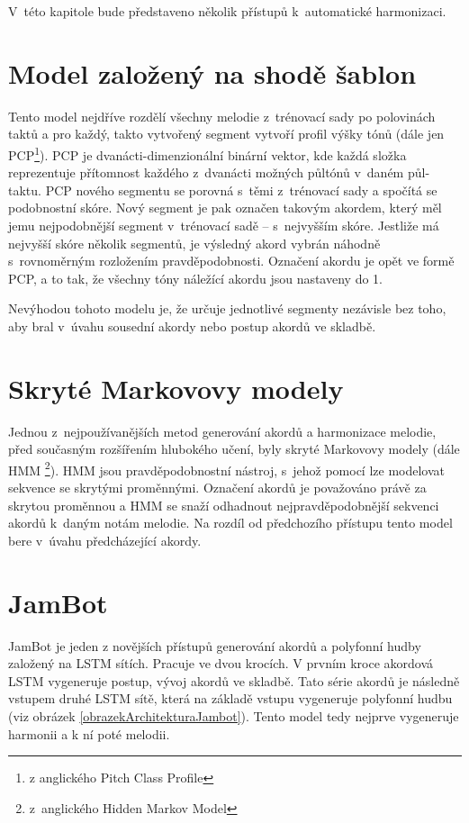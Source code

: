 V~této kapitole bude představeno několik přístupů k~automatické harmonizaci.

\section{Model založený na shodě šablon}
\label{shodaSablon}
Tento model nejdříve rozdělí všechny melodie z~trénovací sady po polovinách taktů 
a pro každý, takto vytvořený segment vytvoří profil výšky tónů 
(dále jen PCP\footnote{z anglického Pitch Class Profile}).
\cite{YinCheng_comparativeStudy}
PCP je dvanácti-dimenzionální binární vektor, 
kde každá složka reprezentuje přítomnost 
každého z~dvanácti možných půltónů v~daném půl-taktu.
\cite{fujishima}
PCP nového segmentu se porovná s~těmi z~trénovací sady
a spočítá se podobnostní skóre.
Nový segment je pak označen takovým akordem,
který měl jemu nejpodobnější segment v~trénovací sadě -- s~nejvyšším skóre.
Jestliže má nejvyšší skóre několik segmentů,
je výsledný akord vybrán náhodně s~rovnoměrným rozložením pravděpodobnosti.
Označení akordu je opět ve formě PCP, a to tak,
že všechny tóny náležící akordu jsou nastaveny do 1.
\par

Nevýhodou tohoto modelu je, že určuje jednotlivé segmenty nezávisle bez toho,
aby bral v~úvahu sousední akordy nebo postup akordů ve skladbě.
\cite{YinCheng_comparativeStudy}

\section{Skryté Markovovy modely}
Jednou z~nejpoužívanějších metod generování akordů a harmonizace melodie, 
před současným rozšířením hlubokého učení, byly skryté Markovovy modely 
(dále HMM \footnote{z~anglického Hidden Markov Model}).
HMM jsou pravděpodobnostní nástroj, 
s~jehož pomocí lze modelovat sekvence se skrytými proměnnými.
Označení akordů je považováno právě za skrytou proměnnou a 
HMM se snaží odhadnout nejpravděpodobnější sekvenci akordů
k~daným notám melodie.
Na rozdíl od předchozího přístupu 
tento model bere v~úvahu předcházející akordy.
\cite{YinCheng_comparativeStudy}

\section{JamBot}
\label{Jambot}
JamBot \cite{Brunner_Jambot} je jeden z novějších přístupů generování akordů 
a polyfonní hudby založený na LSTM sítích.
Pracuje ve dvou krocích.
V prvním kroce akordová LSTM vygeneruje postup, vývoj akordů ve skladbě.
Tato série akordů je následně vstupem druhé LSTM sítě,
která na základě vstupu vygeneruje polyfonní hudbu (viz obrázek \ref{obrazekArchitekturaJambot}).
Tento model tedy nejprve vygeneruje harmonii a k ní poté melodii.
\par

